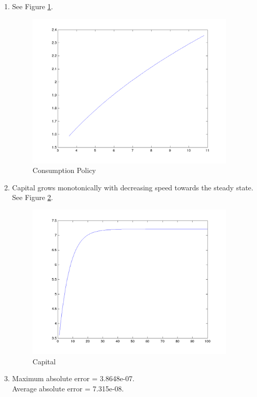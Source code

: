 \begin{enumerate}
\item See Figure \ref{Q4_5}.
\begin{figure}[htbp]
\begin{center}
	\includegraphics[width=10cm]{Figure/Q4_5.png}	
\caption{Consumption Policy}
\label{Q4_5}
\end{center}
\end{figure}

\item
Capital grows monotonically with decreasing speed towards the steady state. See Figure \ref{Q4_6}.
\begin{figure}[htbp]
\begin{center}
	\includegraphics[width=10cm]{Figure/Q4_6.png}	
\caption{Capital}
\label{Q4_6}
\end{center}
\end{figure}

\item
Maximum absolute error = 3.8648e-07.\\
Average absolute error = 7.315e-08.
\end{enumerate}